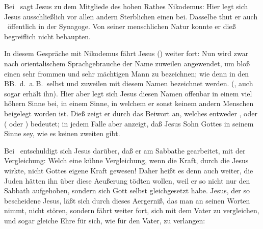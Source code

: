 \begin{aufza}
\item Bei \ sagt Jesus zu dem Mitgliede des hohen Rathes Nikodemus:  Hier legt sich Jesus ausschließlich vor allen andern Sterblichen einen  bei. Dasselbe thut er auch \ öffentlich in der Synagoge. Von seiner menschlichen Natur konnte er dieß begreiflich nicht behaupten.
\item In diesem Gespräche mit Nikodemus fährt Jesus () weiter fort:  Nun wird zwar nach orientalischem Sprachgebrauche der Name  zuweilen angewendet, um bloß einen sehr frommen und sehr mächtigen Mann zu bezeichnen; wie denn in den BB.~d.\ a.\,B.\ selbst  und  zuweilen mit diesem Namen bezeichnet werden. (, auch sogar  erhält ihn). Hier aber legt sich Jesus diesen Namen offenbar in einem viel höhern Sinne bei, in einem Sinne, in welchem er sonst keinem andern Menschen beigelegt worden ist. Dieß zeigt er durch das Beiwort  an, welches entweder , oder  ( oder ) bedeutet; in jedem Falle aber anzeigt, daß Jesus Sohn Gottes in seinem Sinne sey, wie es keinen zweiten gibt.
\item Bei \ entschuldigt sich Jesus darüber, daß er am Sabbathe gearbeitet, mit der Vergleichung:  Welch eine kühne Vergleichung, wenn die Kraft, durch die Jesus wirkte, nicht Gottes eigene Kraft gewesen! Daher heißt es denn auch weiter, die Juden hätten ihn über diese Aeußerung tödten wollen, weil er so nicht nur den Sabbath aufgehoben, sondern sich Gott selbst gleichgesetzt habe. Jesus, der so bescheidene Jesus, läßt sich durch dieses Aergerniß, das man an seinen Worten nimmt, nicht stören, sondern fährt weiter fort, sich mit dem Vater zu vergleichen, und sogar gleiche Ehre für sich, wie für den Vater, zu verlangen: 

\end{aufza}
